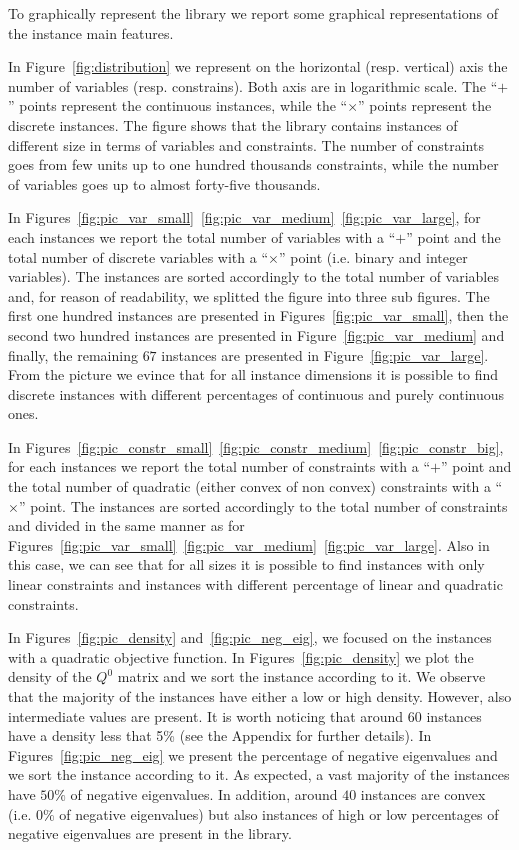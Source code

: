 To graphically represent the library we report some
graphical representations of the instance main features.

In Figure~\ref{fig:distribution} we represent 
on the horizontal (resp. vertical) axis the number of variables (resp.
constrains). Both axis are in logarithmic scale.
The ``$+$'' points represent  the continuous instances, while the 
``$\times$'' points represent the discrete instances. The figure shows that
the library contains instances of different size in terms of variables
and constraints. The number of constraints goes from few units up to
one hundred thousands constraints, while the number of variables goes
up to almost forty-five thousands.

In Figures~\ref{fig:pic_var_small}~\ref{fig:pic_var_medium}~\ref{fig:pic_var_large},
for each instances we report the total number of variables with a
``$+$'' point and  the total number of discrete variables with a
``$\times$'' point (i.e. binary and integer variables). The instances are
sorted accordingly to the total number of variables and, for reason of
readability, we splitted the figure into three sub figures. The first one hundred
instances are presented in Figures~\ref{fig:pic_var_small},
then the second two hundred instances are presented in
Figure~\ref{fig:pic_var_medium} and finally, the remaining $67$
instances are presented in Figure~\ref{fig:pic_var_large}.
From the picture we evince that for all instance dimensions it is
possible to find discrete instances with different percentages of
continuous and purely continuous ones.



In Figures~\ref{fig:pic_constr_small}~\ref{fig:pic_constr_medium}~\ref{fig:pic_constr_big},
for each instances we report the total number of constraints with a
``$+$'' point and the total number of quadratic (either convex of non
convex) constraints with a ``$\times$'' point. The instances are sorted
accordingly to the total number of constraints  and divided in the
same manner as for Figures~\ref{fig:pic_var_small}~\ref{fig:pic_var_medium}~\ref{fig:pic_var_large}.
Also in this case, we can see that for all sizes it is possible to
find instances with only linear constraints and instances with
different percentage of linear and quadratic constraints.

In Figures~\ref{fig:pic_density} and~\ref{fig:pic_neg_eig},  we
focused on the instances with a quadratic objective function.
In Figures~\ref{fig:pic_density} we plot the density of the $Q^0$
matrix and we sort the instance according to it. We observe that the
majority of the instances have either a low or high density. However,
also intermediate values are present. It is worth noticing that around 60 instances have a 
density less that 5\% (see the Appendix for further details). 
In Figures~\ref{fig:pic_neg_eig} we present  the percentage of
negative eigenvalues and we sort the instance according to it. As
expected, a vast majority of the instances have $50\% $ of negative
eigenvalues. In addition, around $40$ instances are convex (i.e. $0\%$
of negative eigenvalues) but also instances of high or low percentages
of negative eigenvalues are present in the library.


